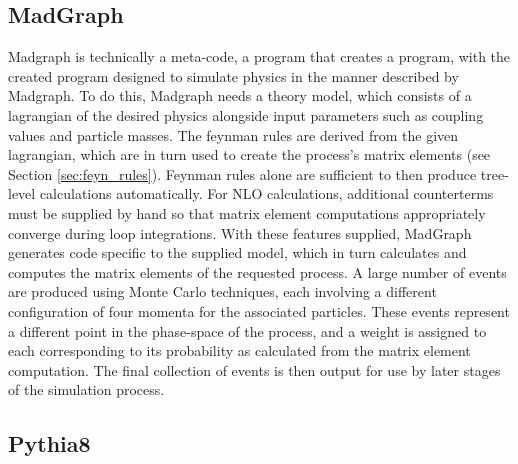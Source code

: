     \subsection{MadGraph}

    Madgraph is technically a meta-code, a program that creates a program,
        with the created program designed to simulate physics in the manner described by Madgraph.
    To do this, Madgraph needs a theory model, which consists of a lagrangian of the desired physics
        alongside input parameters such as coupling values and particle masses.
    The feynman rules are derived from the given lagrangian,
        which are in turn used to create the process's matrix elements (see Section \ref{sec:feyn_rules}).
    Feynman rules alone are sufficient to then produce tree-level calculations automatically.
    For NLO calculations, additional counterterms must be supplied by hand
        so that matrix element computations appropriately converge during loop integrations. 
    With these features supplied, MadGraph generates code specific to the supplied model,
        which in turn calculates and computes the matrix elements of the requested process\cite{madgraph}.
    A large number of events are produced using Monte Carlo techniques,
        each involving a different configuration of four momenta for the associated particles.
    These events represent a different point in the phase-space of the process,
        and a weight is assigned to each corresponding to its probability as calculated from the matrix element computation.
    The final collection of events is then output for use by later stages of the simulation process.


    \subsection{Pythia8}

